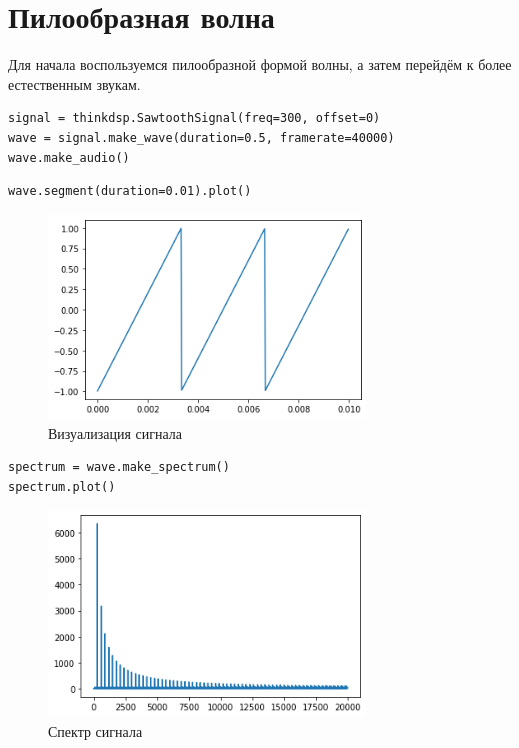 \documentclass[a4paper,12pt]{report}
\begin{document}
\section{Пилообразная волна}

Для начала воспользуемся пилообразной формой волны, а затем перейдём к более естественным звукам.

\begin{lstlisting}[caption=Создание пилообразного сигнала]
signal = thinkdsp.SawtoothSignal(freq=300, offset=0)
wave = signal.make_wave(duration=0.5, framerate=40000)
wave.make_audio()
\end{lstlisting}

\begin{lstlisting}[caption=Визуализация сигнала]
wave.segment(duration=0.01).plot()
\end{lstlisting}

\begin{figure}[H]
        \centering
        \includegraphics[width=0.75\textwidth]{lab6_fig3_1.png}
        \caption{Визуализация сигнала}
        \label{fig:lab6_fig3_1}
\end{figure}

\begin{lstlisting}[caption=Спектр сигнала]
spectrum = wave.make_spectrum()
spectrum.plot()
\end{lstlisting}

\begin{figure}[H]
        \centering
        \includegraphics[width=0.75\textwidth]{lab6_fig3_2.png}
        \caption{Спектр сигнала}
        \label{fig:lab6_fig3_2}
\end{figure}
\end{document}
